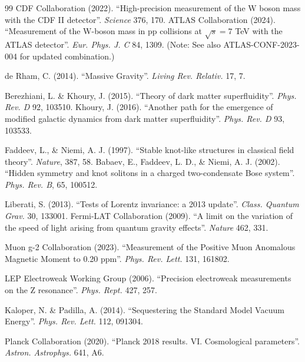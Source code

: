 \documentclass[a4paper,12pt]{article}
\begin{document}
\begin{thebibliography}{99}
 CDF Collaboration (2022). ``High-precision measurement of the W boson mass with the CDF II detector''. \textit{Science} 376, 170.
 ATLAS Collaboration (2024). ``Measurement of the W-boson mass in pp collisions at $\sqrt{s}=7$ TeV with the ATLAS detector''. \textit{Eur. Phys. J. C} 84, 1309. (Note: See also ATLAS-CONF-2023-004 for updated combination.)


 de Rham, C. (2014). ``Massive Gravity''. \textit{Living Rev. Relativ.} 17, 7.

 Berezhiani, L. \& Khoury, J. (2015). ``Theory of dark matter superfluidity''. \textit{Phys. Rev. D} 92, 103510.
 Khoury, J. (2016). ``Another path for the emergence of modified galactic dynamics from dark matter superfluidity''. \textit{Phys. Rev. D} 93, 103533.

 Faddeev, L., \& Niemi, A. J. (1997). ``Stable knot-like structures in classical field theory''. \textit{Nature}, 387, 58.
 Babaev, E., Faddeev, L. D., \& Niemi, A. J. (2002). ``Hidden symmetry and knot solitons in a charged two-condensate Bose system''. \textit{Phys. Rev. B}, 65, 100512.

 Liberati, S. (2013). ``Tests of Lorentz invariance: a 2013 update''. \textit{Class. Quantum Grav.} 30, 133001.
 Fermi-LAT Collaboration (2009). ``A limit on the variation of the speed of light arising from quantum gravity effects''. \textit{Nature} 462, 331.

 Muon g-2 Collaboration (2023). ``Measurement of the Positive Muon Anomalous Magnetic Moment to 0.20 ppm''. \textit{Phys. Rev. Lett.} 131, 161802.

 LEP Electroweak Working Group (2006). ``Precision electroweak measurements on the Z resonance''. \textit{Phys. Rept.} 427, 257.


 Kaloper, N. \& Padilla, A. (2014). ``Sequestering the Standard Model Vacuum Energy''. \textit{Phys. Rev. Lett.} 112, 091304.

 Planck Collaboration (2020). ``Planck 2018 results. VI. Cosmological parameters''. \textit{Astron. Astrophys.} 641, A6.


\end{thebibliography}
\end{document}
